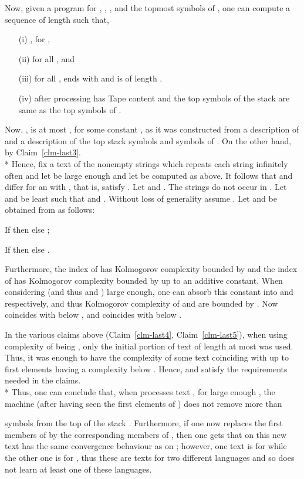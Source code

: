 \documentclass{LMCS}
\theoremstyle{plain}\newtheorem{athm}[thm]{Theorem}
\theoremstyle{plain}\newtheorem{aprop}[thm]{Proposition}
\theoremstyle{plain}\newtheorem{aprob}[thm]{Open Problem}
\theoremstyle{plain}\newtheorem{acor}[thm]{Corollary}
\theoremstyle{plain}\newtheorem{alem}[thm]{Lemma}
\theoremstyle{definition}\newtheorem{adefn}[thm]{Definition}
\theoremstyle{definition}\newtheorem{arem}[thm]{Remark}
\theoremstyle{plain}\newtheorem{aexmp}[thm]{Example}
\theoremstyle{plain}\newtheorem{aclm}[thm]{Claim}
\def\niceqed{~~}
\def\sp{\\*\indent}
\begin{document}
Now, given a program for , ,
,
 and the topmost  symbols
of , one can compute a sequence  of length 
such that,
\begin{enumerate}[(i)]
\item[(i)] , for ,
\item[(ii)] for all ,  and
\item[(iii)] for all , 
    ends with  and is of length
   .  
\item[(iv)]  after processing
 has Tape  content  and
the top  symbols of the stack are same as the
top  symbols of .
\end{enumerate}
Now, , is at most 
, for some constant ,
as it was constructed from a description of  and a description of the top
 stack symbols and  symbols of .
On the other hand, 
 by Claim~\ref{clm-last3}.
\sp
Hence, fix a text  of the nonempty strings which repeats each
string infinitely often
and let  be large enough and let  be computed as above.
It follows that  and  
differ for an  with , that is, satisfy
. Let  and
. The strings  do not occur in . Let  and  be least such that  and .
Without loss of generality assume .
Let  and  be obtained from  as follows:
\begin{iteMize}{}
\item If  then 
 else ;
\item If  then
 else .
\end{iteMize}
Furthermore, the index of  has Kolmogorov complexity bounded by
 and the index of  has Kolmogorov complexity bounded
by  up to an additive constant. 
When considering  (and thus  and ) large 
enough, one can absorb this constant into  and 
respectively, and thus
Kolmogorov complexity of  and  are bounded by .
Now  coincides with  below , and
 coincides with  below .

In the various claims above (Claim~\ref{clm-last4}, Claim~\ref{clm-last5}), 
when using complexity of  being , 
only the initial portion of text  of length at most  was used.
Thus, it was enough to have the complexity of some text  coinciding
with  up to first  elements having a complexity below .
Hence,  and  satisfy the requirements needed in the claims.
\sp
Thus, one can conclude that, when  processes text ,
for large enough , the machine  (after having seen the first
 elements of ) does not remove more than 

symbols from the top of the stack .
Furthermore, if one now replaces the first  members of 
by the corresponding members of , then one gets that  on
this new text  has the same convergence behaviour as on
; however, one text is for  while the other one is for
, thus these are texts for two different languages and so 
does not learn at least one of these languages.\niceqed
\end{document}
